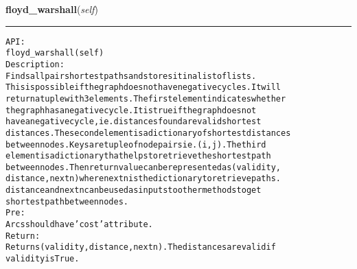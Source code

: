     \label{coinor:gimpy:graph:Graph:floyd_warshall}

    \vspace{0.5ex}

\hspace{.8\funcindent}\begin{boxedminipage}{\funcwidth}

    \raggedright \textbf{floyd\_warshall}(\textit{self})

    \vspace{-1.5ex}

    \rule{\textwidth}{0.5\fboxrule}
\setlength{\parskip}{2ex}
\begin{alltt}

API:
    floyd\_warshall(self)
Description:
    Finds all pair shortest paths and stores it in a list of lists.
    This is possible if the graph does not have negative cycles. It will
    return a tuple with 3 elements. The first element indicates whether
    the graph has a negative cycle. It is true if the graph does not
    have a negative cycle, ie. distances found are valid shortest
    distances. The second element is a dictionary of shortest distances
    between nodes. Keys are tuple of node pairs ie. (i,j). The third
    element is a dictionary that helps to retrieve the shortest path
    between nodes. Then return value can be represented as (validity,
    distance, nextn) where nextn is the dictionary to retrieve paths.
    distance and nextn can be used as inputs to other methods to get
    shortest path between nodes.
Pre:
    Arcs should have 'cost' attribute.
Return:
    Returns (validity, distance, nextn). The distances are valid if
    validity is True.
\end{alltt}

\setlength{\parskip}{1ex}
    \end{boxedminipage}

    \label{coinor:gimpy:graph:Graph:floyd_warshall_get_path}

    \vspace{0.5ex}

